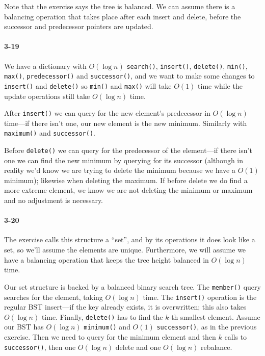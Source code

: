 \documentclass{report}
\begin{document}
Note that the exercise says the tree is balanced. We can assume there is a balancing operation that takes place after each insert and delete, before the successor and predecessor pointers are updated.

\paragraph{3-19} We have a dictionary with $O(\log n)$ \lstinline!search()!, \lstinline!insert()!, \lstinline!delete()!, \lstinline!min()!, \lstinline!max()!, \lstinline!predecessor()! and \lstinline!successor()!, and we want to make some changes to \lstinline!insert()! and \lstinline!delete()! so \lstinline!min()! and \lstinline!max()! will take $O(1)$ time while the update operations still take $O(\log n)$ time.

After \lstinline!insert()! we can query for the new element's predecessor in $O(\log n)$ time---if there isn't one, our new element is the new minimum. Similarly with \lstinline!maximum()! and \lstinline!successor()!.

Before \lstinline!delete()! we can query for the predecessor of the element---if there isn't one we can find the new minimum by querying for its successor (although in reality we'd know we are trying to delete the minimum because we have a $O(1)$ minimum); likewise when deleting the maximum. If before delete we do find a more extreme element, we know we are not deleting the minimum or maximum and no adjustment is necessary.

\paragraph{3-20} The exercise calls this structure a ``set'', and by its operations it does look like a set, so we'll assume the elements are unique. Furthermore, we will assume we have a balancing operation that keeps the tree height balanced in $O(\log n)$ time.

Our set structure is backed by a balanced binary search tree. The \lstinline!member()! query searches for the element, taking $O(\log n)$ time. The \lstinline!insert()! operation is the regular BST insert---if the key already exists, it is overwritten; this also takes $O(\log n)$ time. Finally, \lstinline!delete()! has to find the $k$-th smallest element. Assume our BST has $O(\log n)$ \lstinline!minimum()! and $O(1)$ \lstinline!successor()!, as in the previous exercise. Then we need to query for the minimum element and then $k$ calls to \lstinline!successor()!, then one $O(\log n)$ delete and one $O(\log n)$ rebalance.
\end{document}
